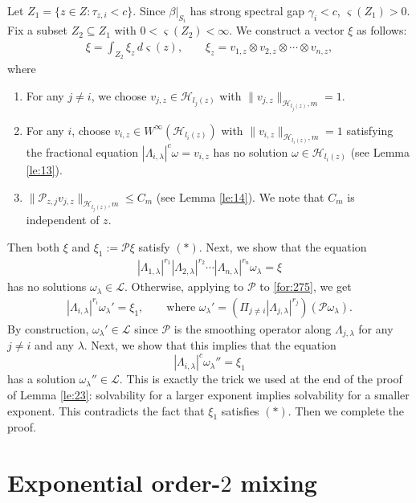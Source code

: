 \documentclass[11 pt]{amsart}
\newcommand{\norm}[1]{\lVert#1\rVert}
\theoremstyle{definition}
\numberwithin{equation}{section}
\begin{document}
Let $Z_1=\{z\in Z: \tau_{z,i}<c\}$.  Since $\beta|_{S_i}$ has strong spectral gap $\gamma_i<c$, $\varsigma(Z_1)>0$.  Fix a subset $Z_2\subseteq Z_1$ with $0<\varsigma(Z_2)<\infty$. We construct a vector $\xi$ as follows:
\begin{align*}
\xi=\int_{Z_2} \xi_z\,d\varsigma(z),\qquad
\xi_z=v_{1,z}\otimes v_{2,z} \otimes\cdots \otimes v_{n,z},
\end{align*}
where
\begin{enumerate}
  \item For any $j\neq i$, we choose $v_{j,z}\in \mathcal{H}_{l_j(z)}$ with $\norm{v_{j,z}}_{\mathcal{H}_{l_j(z)},m}=1$.
  \item For any $i$, choose $v_{i,z}\in W^\infty(\mathcal{H}_{l_i(z)})$ with $\norm{v_{i,z}}_{\mathcal{H}_{l_i(z)}, m}=1$ satisfying
  the
  fractional equation $|\Lambda_{i,\lambda}|^{c}\omega=v_{i,z}$ has no solution $\omega\in \mathcal{H}_{l_i(z)}$  (see Lemma \ref{le:13}).

\item $\norm{\mathcal{P}_{z,j}v_{j,z}}_{\mathcal{H}_{l_j(z)},m}\leq C_m$ (see Lemma \ref{le:14}). We note that $C_m$ is independent of $z$.
\end{enumerate}
Then both $\xi$ and $\xi_1:=\mathcal{P}\xi$ satisfy $(*)$. Next, we show that the equation
\begin{align}\label{for:275}
|\Lambda_{1,\lambda}|^{r_1}|\Lambda_{2,\lambda}|^{r_2}\cdots |\Lambda_{n,\lambda}|^{r_n}\omega_\lambda = \xi
\end{align}
has no solutions $\omega_\lambda\in\mathcal L$. Otherwise, applying to $\mathcal{P}$ to \eqref{for:275}, we get
\begin{align*}
|\Lambda_{i,\lambda}|^{r_i} \omega_\lambda'= \xi_1, \qquad\text{where }\omega_\lambda'= (\Pi_{j\neq i}|\Lambda_{j,\lambda}|^{r_j})(\mathcal{P}\omega_\lambda ).
\end{align*}
By construction, $\omega_\lambda'\in \mathcal{L}$ since $\mathcal{P}$ is the smoothing operator along $\Lambda_{j,\lambda}$ for any $j\neq i$ and any $\lambda$. Next, we show that this implies that the equation
\[
 |\Lambda_{i,\lambda}|^{c} \omega_\lambda''= \xi_1
\]
has a solution $\omega_\lambda''\in \mathcal{L}$. This is exactly the trick we used at the end of  the proof of Lemma \ref{le:23}: solvability for a larger exponent implies solvability for a smaller exponent.
This contradicts the fact that  $\xi_1$ satisfies $(*)$. Then we complete the proof.




\section{Exponential order-$2$ mixing}\label{sec:34}
\end{document}
